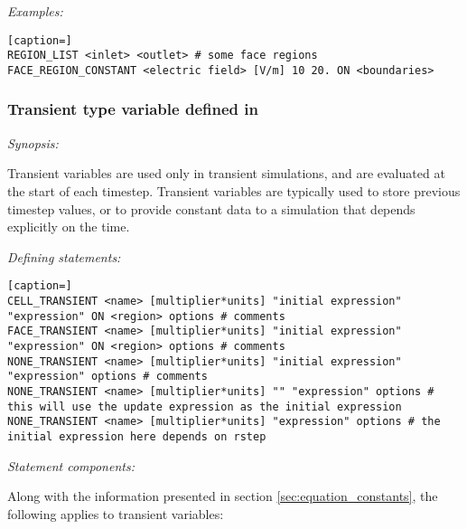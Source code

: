 \emph{Examples:}

\begin{lstlisting}[caption=]
REGION_LIST <inlet> <outlet> # some face regions
FACE_REGION_CONSTANT <electric field> [V/m] 10 20. ON <boundaries> 
\end{lstlisting}

\subsubsection{Transient type variable defined in }

\emph{Synopsis:}

Transient variables are used only in transient simulations, and are evaluated at the start of each timestep.  Transient variables are typically used to store previous timestep values, or to provide constant data to a simulation that depends explicitly on the time.

\emph{Defining statements:}

\begin{lstlisting}[caption=]
CELL_TRANSIENT <name> [multiplier*units] "initial expression" "expression" ON <region> options # comments
FACE_TRANSIENT <name> [multiplier*units] "initial expression" "expression" ON <region> options # comments
NONE_TRANSIENT <name> [multiplier*units] "initial expression" "expression" options # comments
NONE_TRANSIENT <name> [multiplier*units] "" "expression" options # this will use the update expression as the initial expression
NONE_TRANSIENT <name> [multiplier*units] "expression" options # the initial expression here depends on rstep
\end{lstlisting}

\emph{Statement components:}

Along with the information presented in section \ref{sec:equation_constants}, the following applies to transient variables:

